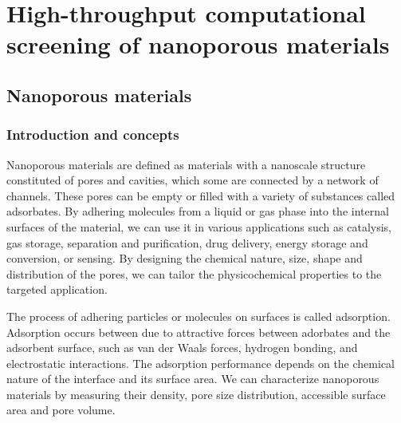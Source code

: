 \documentclass[main.tex]{subfiles}
\begin{document}
\chapter{High-throughput computational screening of nanoporous materials}
\vspace*{-1\baselineskip}

\section{Nanoporous materials}

\subsection{Introduction and concepts}

Nanoporous materials are defined as materials with a nanoscale structure constituted of pores and cavities, which some are connected by a network of channels. These pores can be empty or filled with a variety of substances called adsorbates. By adhering molecules from a liquid or gas phase into the internal surfaces of the material, we can use it in various applications such as catalysis, gas storage, separation and purification, drug delivery, energy storage and conversion, or sensing. By designing the chemical nature, size, shape and distribution of the pores, we can tailor the physicochemical properties to the targeted application.

The process of adhering particles or molecules on surfaces is called adsorption. Adsorption occurs between due to attractive forces between adorbates and the adsorbent surface, such as van der Waals forces, hydrogen bonding, and electrostatic interactions. The adsorption performance depends on the chemical nature of the interface and its surface area. We can characterize nanoporous materials by measuring their density, pore size distribution, accessible surface area and pore volume.\cite{Rouquerol_1994} 
\end{document}
